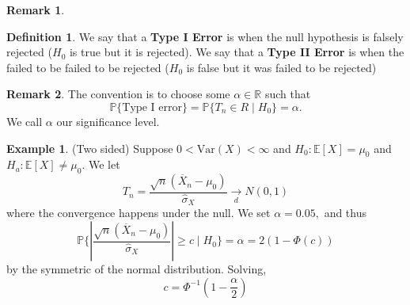 \documentclass[10pt, oneside]{article}
\newcommand{\bbR}{\mathbb{R}}
\newcommand{\bbP}{\mathbb{P}}
\newcommand{\Var}{\text{Var}}
\newcommand{\bbE}{\mathbb{E}}
\theoremstyle{definition}
\newtheorem{exmp}{Example}[section]
\newtheorem{defn}{Definition}
\newtheorem{rem}{Remark}
\begin{document}
\begin{rem}
\begin{center}
\end{center}
\end{rem}


\begin{defn}
    We say that a \textbf{Type I Error} is when the null hypothesis is falsely rejected ($H_0$ is true but it is rejected). We say that a \textbf{Type II Error} is when the failed to be failed to be rejected ($H_0$ is false but it was failed to be rejected)
\end{defn}

\begin{rem}
    The convention is to choose some $\alpha\in \bbR$ such that 
    \[\bbP\{\text{Type I error}\} = \bbP\{T_n \in R \mid H_0\} = \alpha.\] We call $\alpha$ our significance level.
\end{rem}

\begin{exmp}
    (Two sided) Suppose $0 < \Var(X) < \infty$ and $H_0: \bbE[X] =  \mu_0$ and $H_a: \bbE[X] \neq \mu_0$. We let 
    \[T_n = \frac{\sqrt{n}(\overline{X}_n - \mu_0 )}{\hat{\sigma}_X} \xrightarrow[d]{}N(0,1)\] where the convergence happens under the null. We set $\alpha = 0.05,$ and thus 
    \[\bbP\{\left|\frac{\sqrt{n}(\overline{X}_n - \mu_0 )}{\hat{\sigma}_X}\right| \geq c \mid H_0\} = \alpha = 2\left(1 - \Phi(c)\right)  \] by the symmetric of the normal distribution. Solving, 
    \[c = \Phi^{-1}(1 - \frac{\alpha}{2})\]
\end{exmp}
\end{document}
